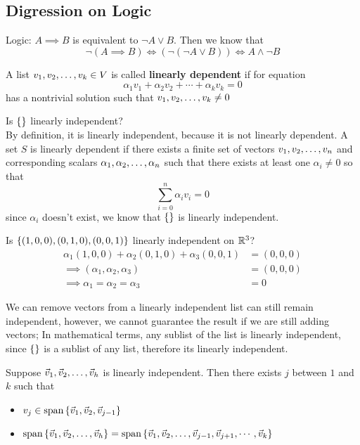 \subsection*{Digression on Logic}
Logic: $A \implies B$ is equivalent to $\neg A \lor B$. Then we know that \[\neg (A \implies B) \iff (\neg(\neg A \lor B)) \iff A \land \neg B\]
\begin{definition}
    A list ${v}_1,{v}_2, \ldots, {v}_{k} \in V$ is called \textbf{linearly dependent} if for equation
    \[ \alpha_1 v_1 + \alpha_2 v_2 + \cdots + \alpha_k v_k = 0\] has a nontrivial solution such that ${v}_1,{v}_2, \ldots, {v}_{k} \neq 0$
\end{definition}
\begin{example}
    Is $\left\{ \right\}$ linearly independent? \\
    By definition, it is linearly independent, because it is not linearly dependent. A set $S$ is linearly dependent if there exists a finite set of vectors ${v}_1,{v}_2, \ldots, {v}_{n}$ and corresponding scalars ${\alpha}_1,{\alpha}_2, \ldots, {\alpha}_{n}$ such that there exists at least one $\alpha_i \neq 0$ so that \[ \sum_{i= 0}^n \alpha_i v_i = 0\] since $\alpha_i$ doesn't exist, we know that $\left\{ \right\}$ is linearly independent.
\end{example}
\begin{example}
    Is $\left\{ (1,0,0),(0,1,0),(0,0,1)\right\}$ linearly independent on $\mathbb R^3$?
    \begin{align*}
        \alpha_1(1,0,0) + \alpha_2(0,1,0) + \alpha_3(0,0,1) &= (0,0,0) \\
        \implies (\alpha_1, \alpha_2, \alpha_3) &= (0,0,0) \\
        \implies \alpha_1 = \alpha_2 = \alpha_3 &= 0
    \end{align*}    
\end{example}
\begin{remark}
    We can remove vectors from a linearly independent list can still remain independent, however, we cannot guarantee the result if we are still adding vectors; In mathematical terms, any sublist of the list is linearly independent, since $\left\{ \right\}$ is a sublist of any list, therefore its linearly independent.
\end{remark}
\begin{lemma}
    Suppose ${\vec v}_1,{\vec v}_2, \ldots, {\vec v}_{h}$ is linearly independent. Then there exists $j$ between $1$ and $k$ such that 
    \begin{itemize}
        \item $v_j \in \text{span} \left\{ \vec v_1, \vec v_2, \vec v_{j-1} \right\}$
        \item $\text{span} \left\{ {\vec v}_1,{\vec v}_2, \ldots, {\vec v}_{h} \right\} = \text{span} \left\{ {\vec v}_1,{\vec v}_2, \ldots, {\vec v}_{j-1}, \vec v_{j+1} , \cdots, \vec v_k \right\}$
    \end{itemize}
\end{lemma}
